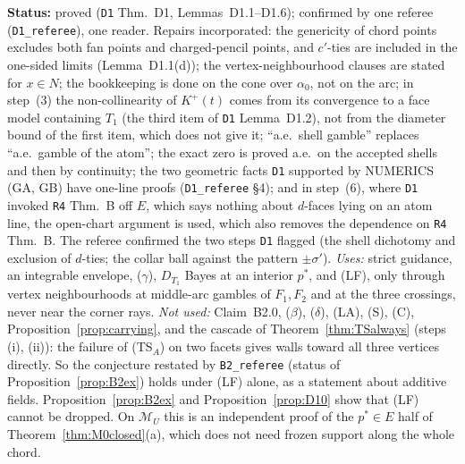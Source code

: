 \documentclass[11pt]{article}
\theoremstyle{definition}
\theoremstyle{remark}
\newcommand{\M}{\mathcal M}
\newcommand{\src}[1]{\texttt{#1}}
\newcommand{\status}[1]{\par\smallskip\noindent\textbf{Status:} #1\par\smallskip}
\begin{document}
\status{proved (\src{D1} Thm.~D1, Lemmas~D1.1--D1.6); confirmed by one referee (\src{D1\_referee}), one reader. Repairs incorporated: the genericity of chord points excludes both fan points and charged-pencil points, and $c'$-ties are included in the one-sided limits (Lemma~D1.1(d)); the vertex-neighbourhood clauses are stated for $x\in N$; the bookkeeping is done on the cone over $\alpha_0$, not on the arc; in step~(3) the non-collinearity of $K^+(t)$ comes from its convergence to a face model containing $T_1$ (the third item of \src{D1} Lemma~D1.2), not from the diameter bound of the first item, which does not give it; ``a.e.\ shell gamble'' replaces ``a.e.\ gamble of the atom''; the exact zero is proved a.e.\ on the accepted shells and then by continuity; the two geometric facts \src{D1} supported by NUMERICS (GA, GB) have one-line proofs (\src{D1\_referee} \S4); and in step~(6), where \src{D1} invoked \src{R4} Thm.~B off $E$, which says nothing about $d$-faces lying on an atom line, the open-chart argument is used, which also removes the dependence on \src{R4} Thm.~B. The referee confirmed the two steps \src{D1} flagged (the shell dichotomy and exclusion of $d$-ties; the collar ball against the pattern $\pm\sigma'$). \emph{Uses:} strict guidance, an integrable envelope, ($\gamma$), $D_{T_1}$ Bayes at an interior $p^*$, and (LF), only through vertex neighbourhoods at middle-arc gambles of $F_1,F_2$ and at the three crossings, never near the corner rays. \emph{Not used:} Claim~B2.0, ($\beta$), ($\delta$), (LA), (S), (C), Proposition~\ref{prop:carrying}, and the cascade of Theorem~\ref{thm:TSalways} (steps (i), (ii)): the failure of (TS$_A$) on two facets gives walls toward all three vertices directly. So the conjecture restated by \src{B2\_referee} (status of Proposition~\ref{prop:B2ex}) holds under (LF) alone, as a statement about additive fields. Proposition~\ref{prop:B2ex} and Proposition~\ref{prop:D10} show that (LF) cannot be dropped. On $\M_U$ this is an independent proof of the $p^*\in E$ half of Theorem~\ref{thm:M0closed}(a), which does not need frozen support along the whole chord.}
\end{document}
